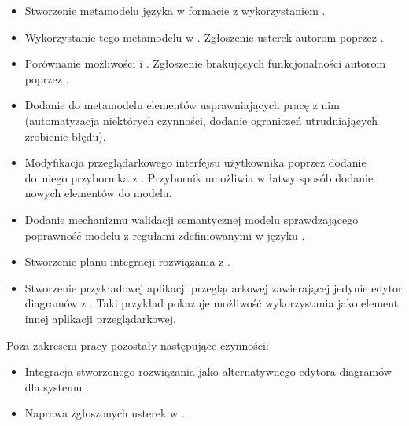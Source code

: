\begin{itemize}
	\item Stworzenie metamodelu języka \CAL{} w formacie \Ecore{} z wykorzystaniem \SiriusDesktop{}.
	\item Wykorzystanie tego metamodelu w \SiriusWeb{}. Zgłoszenie usterek autorom \SiriusWeb{} poprzez \GitHub{}.
	\item Porównanie możliwości \SiriusWeb{} i \SiriusDesktop{}. Zgłoszenie brakujących funkcjonalności autorom \SiriusWeb{} poprzez \GitHub{}.
	\item Dodanie do metamodelu elementów usprawniających pracę z nim (automatyzacja niektórych czynności, dodanie ograniczeń utrudniających zrobienie błędu).
	\item Modyfikacja przeglądarkowego interfejsu użytkownika \SiriusWeb{} poprzez dodanie do~niego przybornika z \BalticLSC{}. Przybornik umożliwia w łatwy sposób dodanie nowych elementów do modelu.
	\item Dodanie mechanizmu walidacji semantycznej modelu sprawdzającego poprawność modelu z regułami zdefiniowanymi w języku \Java{}.
	\item Stworzenie planu integracji rozwiązania z \BalticLSC{}.
	\item Stworzenie przykładowej aplikacji przeglądarkowej zawierającej jedynie edytor diagramów z \SiriusWeb{}. Taki przykład pokazuje możliwość wykorzystania \SiriusWeb{} jako element innej aplikacji przeglądarkowej.
\end{itemize}

\vspace{1em}

\noindent Poza zakresem pracy pozostały następujące czynności:

\begin{itemize}
	\item Integracja stworzonego rozwiązania jako alternatywnego edytora diagramów dla systemu \BalticLSC{}.
	\item Naprawa zgłoszonych usterek w \SiriusWeb{}.
\end{itemize}
